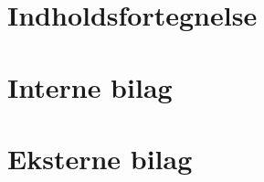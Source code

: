 \documentclass[12pt]{report}
\begin{document}





\newpage


\chapter{Indholdsfortegnelse}
\makeatletter
\renewcommand\tableofcontents{%
}
\makeatother
\tableofcontents
\pagebreak




\newpage
















\newpage








\newpage

\chapter{Interne bilag}
%


\chapter{Eksterne bilag}
%
\end{document}
